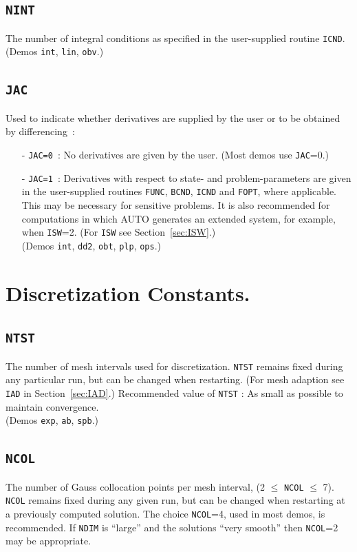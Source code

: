 \documentclass[12pt]{report}
\begin{document}
\subsection{\tt NINT}  \label{sec:NINT}
 The number of integral conditions as specified in the user-supplied
 routine {\tt ICND}. \\ 
(Demos {\tt int}, {\tt lin}, {\tt obv}.)

\subsection{\tt JAC}  \label{sec:JAC}
 Used to indicate whether derivatives are supplied by the user
 or to be obtained by differencing~:
\begin{itemize}
\item[-] {\tt JAC=0}~: 
  No derivatives are given by the user. (Most demos use {\tt JAC}=0.)
\item[-] {\tt JAC=1}~:  
  Derivatives with respect to state- and problem-parameters are given 
  in the user-supplied routines 
  {\tt FUNC}, {\tt BCND}, {\tt ICND} and {\tt FOPT}, where 
  applicable.  This may be necessary for sensitive problems. 
  It is also recommended for computations in which {\cal AUTO} generates 
  an extended system, for example, when {\tt ISW}=2.
  (For {\tt ISW} see Section~\ref{sec:ISW}.) \\
(Demos {\tt int}, {\tt dd2}, {\tt obt}, {\tt plp}, {\tt ops}.)
\end{itemize}
\section{ Discretization Constants.} \label{sec:Discretization_constants}
\subsection{\tt NTST}  \label{sec:NTST}
 The number of mesh intervals used for discretization.
 {\tt NTST} remains fixed during any particular run, but can be changed
 when restarting. 
 (For mesh adaption see {\tt IAD} in Section~\ref{sec:IAD}.)
 Recommended value of {\tt NTST} : As small as possible to maintain convergence. \\ 
 (Demos {\tt exp}, {\tt ab}, {\tt spb}.)


\subsection{\tt NCOL}  \label{sec:NCOL}
 The number of Gauss collocation points per mesh interval,
 (2 $\le$ {\tt NCOL} $\le$ 7).
 {\tt NCOL} remains fixed during any given run, but can be changed
 when restarting at a previously computed solution.
 The choice {\tt NCOL}=4, used in most demos, is recommended.
 If {\tt NDIM} is ``large'' and the solutions ``very smooth'' then
 {\tt NCOL}=2 may be appropriate.
\end{document}
